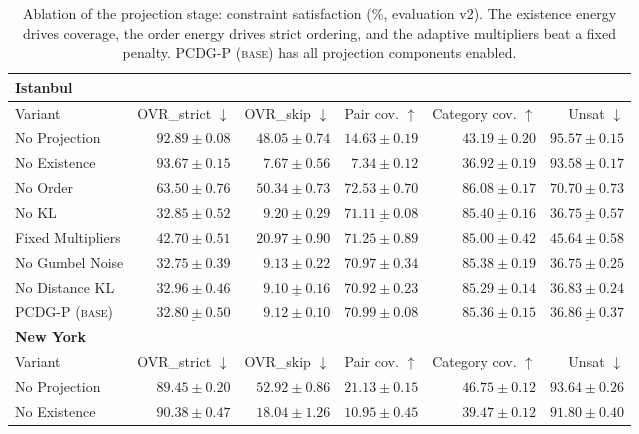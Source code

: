 \begin{table}[t]
\centering
\footnotesize
\setlength{\tabcolsep}{3pt}
\caption{Ablation of the projection stage: constraint satisfaction (\%, evaluation v2). The existence
energy drives coverage, the order energy drives strict ordering, and the adaptive multipliers beat a
fixed penalty. \textsc{PCDG-P (base)} has all projection components enabled.}
\label{tab:ablation}
\begin{tabular}{lrrrrr}
\toprule
\multicolumn{6}{l}{\textbf{Istanbul}} \\
\midrule
Variant & OVR\_strict $\downarrow$ & OVR\_skip $\downarrow$ & Pair cov. $\uparrow$ & Category cov. $\uparrow$ & Unsat $\downarrow$ \\
\midrule
No Projection & $92.89\pm 0.08$ & $48.05\pm 0.74$ & $14.63\pm 0.19$ & $43.19\pm 0.20$ & $95.57\pm 0.15$ \\
No Existence & $93.67\pm 0.15$ & $\mathbf{7.67\pm 0.56}$ & $7.34\pm 0.12$ & $36.92\pm 0.19$ & $93.58\pm 0.17$ \\
No Order & $63.50\pm 0.76$ & $50.34\pm 0.73$ & $\mathbf{72.53\pm 0.70}$ & $\mathbf{86.08\pm 0.17}$ & $70.70\pm 0.73$ \\
No KL & $32.85\pm 0.52$ & $9.20\pm 0.29$ & $\underline{71.11\pm 0.08}$ & $\underline{85.40\pm 0.16}$ & $\underline{36.75\pm 0.57}$ \\
Fixed Multipliers & $42.70\pm 0.51$ & $20.97\pm 0.90$ & $71.25\pm 0.89$ & $85.00\pm 0.42$ & $45.64\pm 0.58$ \\
No Gumbel Noise & $\mathbf{32.75\pm 0.39}$ & $9.13\pm 0.22$ & $70.97\pm 0.34$ & $85.38\pm 0.19$ & $\mathbf{36.75\pm 0.25}$ \\
No Distance KL & $32.96\pm 0.46$ & $\underline{9.10\pm 0.16}$ & $70.92\pm 0.23$ & $85.29\pm 0.14$ & $36.83\pm 0.24$ \\
\textsc{PCDG-P (base)} & $\underline{32.80\pm 0.50}$ & $9.12\pm 0.10$ & $70.99\pm 0.08$ & $85.36\pm 0.15$ & $\underline{36.86\pm 0.37}$ \\
\midrule
\multicolumn{6}{l}{\textbf{New York}} \\
\midrule
Variant & OVR\_strict $\downarrow$ & OVR\_skip $\downarrow$ & Pair cov. $\uparrow$ & Category cov. $\uparrow$ & Unsat $\downarrow$ \\
\midrule
No Projection & $89.45\pm 0.20$ & $52.92\pm 0.86$ & $21.13\pm 0.15$ & $46.75\pm 0.12$ & $93.64\pm 0.26$ \\
No Existence & $90.38\pm 0.47$ & $18.04\pm 1.26$ & $10.95\pm 0.45$ & $39.47\pm 0.12$ & $91.80\pm 0.40$ \\

\end{tabular}
\end{table}
